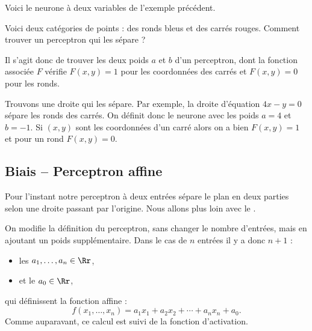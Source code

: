 \documentclass[11pt,class=report,crop=false]{standalone}
\begin{document}
  
Voici le neurone à deux variables de l'exemple précédent.

\begin{exemple}
Voici deux catégories de points : des ronds bleus et des carrés rouges. Comment trouver un perceptron qui les sépare ?


Il s'agit donc de trouver les deux poids $a$ et $b$ d'un perceptron, dont la fonction associée
$F$ vérifie $F(x,y)=1$ pour les coordonnées des carrés et $F(x,y)=0$ pour les ronds.


Trouvons une droite qui les sépare. Par exemple, la droite d'équation $4x-y=0$ sépare les ronds des carrés. On définit donc le neurone avec les poids $a=4$ et $b=-1$.
Si $(x,y)$ sont les coordonnées d'un carré alors on a bien $F(x,y)=1$ et pour un rond $F(x,y)=0$.

\begin{center}
\begin{minipage}{0.35\textwidth}
\end{minipage}
\begin{minipage}{0.45\textwidth}
\end{minipage}
\end{center}


\end{exemple}


\subsection{Biais -- Perceptron affine}

Pour l'instant notre perceptron à deux entrées sépare le plan en deux parties selon une droite passant par l'origine.
Nous allons plus loin avec le .

On modifie la définition du perceptron, sans changer le nombre d'entrées, mais en ajoutant un poids supplémentaire.
Dans le cas de $n$ entrées il y  a donc $n+1$  : 
\begin{itemize} 
  \item les  $a_1,\ldots,a_n \in \Rr$,
  \item et le  $a_0 \in \Rr$,
\end{itemize}
qui définissent la fonction affine :
$$f(x_1,\ldots,x_n) = a_1 x_1 + a_2 x_2 + \cdots + a_n x_n + a_0.$$
Comme auparavant, ce calcul est suivi de la fonction d'activation.
\end{document}
